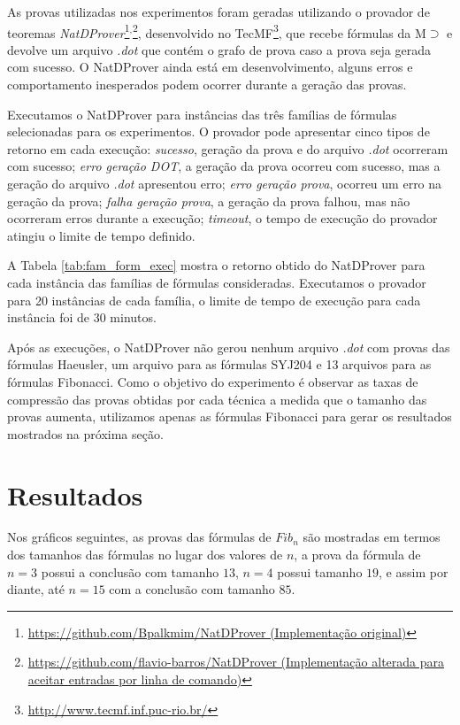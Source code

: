 As provas utilizadas nos experimentos foram geradas utilizando o provador de teoremas \textit{NatDProver}\footnote{\href{https://github.com/Bpalkmim/NatDProver}{https://github.com/Bpalkmim/NatDProver (Implementação original)}}$^{\text{,}}$\footnote{\href{https://github.com/flavio-barros/NatDProver}{https://github.com/flavio-barros/NatDProver (Implementação alterada para aceitar entradas por linha de comando)}}, desenvolvido no TecMF\footnote{\href{http://www.tecmf.inf.puc-rio.br/}{http://www.tecmf.inf.puc-rio.br/}}, que recebe fórmulas da M$\supset$ e devolve um arquivo \textit{.dot} que contém o grafo de prova caso a prova seja gerada com sucesso. O NatDProver ainda está em desenvolvimento, alguns erros e comportamento inesperados podem ocorrer durante a geração das provas.

Executamos o NatDProver para instâncias das três famílias de fórmulas selecionadas para os experimentos. O provador pode apresentar cinco tipos de retorno em cada execução: \textit{sucesso}, geração da prova e do arquivo \textit{.dot} ocorreram com sucesso; \textit{erro geração DOT}, a geração da prova ocorreu com sucesso, mas a geração do arquivo \textit{.dot} apresentou erro; \textit{erro geração prova}, ocorreu um erro na geração da prova; \textit{falha geração prova}, a geração da prova falhou, mas não ocorreram erros durante a execução; \textit{timeout}, o tempo de execução do provador atingiu o limite de tempo definido.

A Tabela \ref{tab:fam_form_exec} mostra o retorno obtido do NatDProver para cada instância das famílias de fórmulas consideradas. Executamos o provador para 20 instâncias de cada família, o limite de tempo de execução para cada instância foi de 30 minutos.



Após as execuções, o NatDProver não gerou nenhum arquivo \textit{.dot} com provas das fórmulas Haeusler, um arquivo para as fórmulas SYJ204 e 13 arquivos para as fórmulas Fibonacci. Como o objetivo do experimento é observar as taxas de compressão das provas obtidas por cada técnica a medida que o tamanho das provas aumenta, utilizamos apenas as fórmulas Fibonacci para gerar os resultados mostrados na próxima seção.

\section{Resultados}
\label{sec:resultados}

Nos gráficos seguintes, as provas das fórmulas de $Fib_n$ são mostradas em termos dos tamanhos das fórmulas no lugar dos valores de $n$, a prova da fórmula de $n = 3$ possui a conclusão com tamanho $13$, $n = 4$ possui tamanho $19$, e assim por diante, até $n = 15$ com a conclusão com tamanho $85$.

